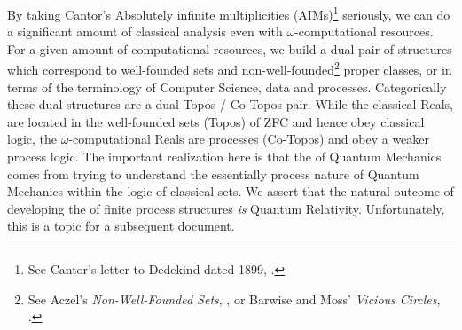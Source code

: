 By taking Cantor's Absolutely infinite multiplicities (AIMs)\footnote{See 
Cantor's letter to Dedekind dated 1899, 
\cite{vanHeijenoort1967fregeToGodel}.} seriously, we can do a significant 
amount of classical analysis even with $\omega$-computational resources. 
For a given amount of computational resources, we build a dual pair of 
structures which correspond to well-founded sets and 
non-well-founded\footnote{See Aczel's \emph{Non-Well-Founded Sets}, 
\cite{aczel1988nonWellFoundedSets}, or Barwise and Moss' \emph{Vicious 
Circles}, \cite{barwiseMoss1996viciousCircles}.} proper classes, or in 
terms of the terminology of Computer Science, data and processes. 
Categorically these dual structures are a dual Topos / Co-Topos pair. 
While the classical Reals, are located in the well-founded sets (Topos) of 
ZFC and hence obey classical logic, the $\omega$-computational Reals are 
processes (Co-Topos) and obey a weaker process logic. The important 
realization here is that the  of Quantum Mechanics 
comes from trying to understand the essentially process nature of Quantum 
Mechanics within the logic of classical sets. We assert that the natural 
outcome of developing the  of finite process structures 
\emph{is} Quantum Relativity. Unfortunately, this is a topic for a 
subsequent document. 


